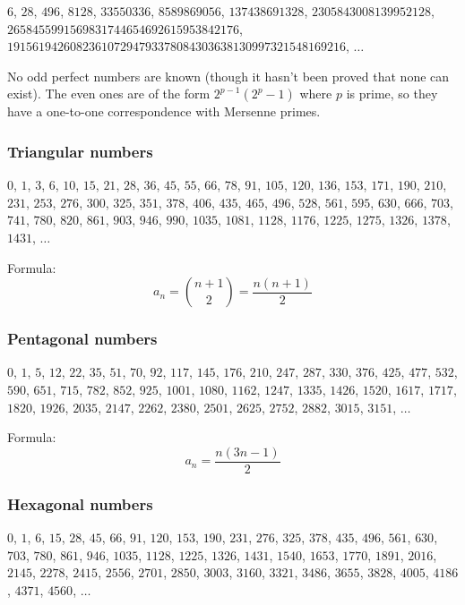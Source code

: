 \documentclass[a4paper,12pt]{article}
\begin{document}
\begin{center}$6$, $28$, $496$, $8128$, $33550336$, $8589869056$, $137438691328$, $2305843008139952128$, $2658455991569831744654692615953842176$, $191561942608236107294793378084303638130997321548169216$, $\ldots$\end{center}

No odd perfect numbers are known (though it hasn't been proved that none can exist). The even ones are of the form $2^{p-1}(2^p-1)$ where $p$ is prime, so they have a one-to-one correspondence with Mersenne primes.

\subsubsection{Triangular numbers}

\begin{center}$0$, $1$, $3$, $6$, $10$, $15$, $21$, $28$, $36$, $45$, $55$, $66$, $78$, $91$, $105$, $120$, $136$, $153$, $171$, $190$, $210$, $231$, $253$, $276$, $300$, $325$, $351$, $378$, $406$, $435$, $465$, $496$, $528$, $561$, $595$, $630$, $666$, $703$, $741$, $780$, $820$, $861$, $903$, $946$, $990$, $1035$, $1081$, $1128$, $1176$, $1225$, $1275$, $1326$, $1378$, $1431$, $\ldots$\end{center}

\noindent Formula:
\[a_n={{n+1}\choose 2}=\frac{n(n+1)}{2}\]

\subsubsection{Pentagonal numbers}

\begin{center}$0$, $1$, $5$, $12$, $22$, $35$, $51$, $70$, $92$, $117$, $145$, $176$, $210$, $247$, $287$, $330$, $376$, $425$, $477$, $532$, $590$, $651$, $715$, $782$, $852$, $925$, $1001$, $1080$, $1162$, $1247$, $1335$, $1426$, $1520$, $1617$, $1717$, $1820$, $1926$, $2035$, $2147$, $2262$, $2380$, $2501$, $2625$, $2752$, $2882$, $3015$, $3151$, $\ldots$\end{center}

\noindent Formula:
\[a_n=\frac{n(3n-1)}{2}\]

\subsubsection{Hexagonal numbers}

\begin{center}$0$, $1$, $6$, $15$, $28$, $45$, $66$, $91$, $120$, $153$, $190$, $231$, $276$, $325$, $378$, $435$, $496$, $561$, $630$, $703$, $780$, $861$, $946$, $1035$, $1128$, $1225$, $1326$, $1431$, $1540$, $1653$, $1770$, $1891$, $2016$, $2145$, $2278$, $2415$, $2556$, $2701$, $2850$, $3003$, $3160$, $3321$, $3486$, $3655$, $3828$, $4005$, $4186$, $4371$, $4560$, $\ldots$\end{center}
\end{document}
